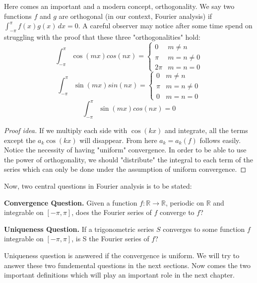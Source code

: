 \documentclass{article}
\theoremstyle{remark}
\theoremstyle{lemma}
\theoremstyle{example}
\theoremstyle{proofTrial}
\theoremstyle{definition}
\begin{document}
    Here comes an important and a modern concept, orthogonality\footnotemark{}. We say two functions $f$ and $g$ are orthogonal (in our context, Fourier analysis) if $\int_{-\pi}^{\pi} f(x)g(x)\,dx = 0$. A careful observer may notice after some time spend on struggling with the proof that these three "orthogonalities" hold:
    \[
    \int_{-\pi}^{\pi} \cos(mx)cos(nx) = \begin{cases}
                                        0 & m \neq n \\
                                      \pi &  m = n \neq 0\\
                                     2\pi & m = n = 0
                                        \end{cases}
    \]
    \[
    \int_{-\pi}^{\pi} \sin(mx)sin(nx) = \begin{cases}
                                        0 & m \neq n \\
                                      \pi &  m = n \neq 0\\
                                        0 & m = n = 0
                                        \end{cases}
    \]
    \[
    \int_{-\pi}^{\pi} \sin(mx)cos(nx) = 0
    \]

\begin{proof}[Proof idea]
    If we multiply each side with $\cos(kx)$ and integrate, all the terms except the $a_k \cos(kx)$ will disappear. From here $a_k = a_k(f)$ follows easily. \hfill
    \indent Notice the necessity of having "uniform" convergence. In order to be able to use the power of orthogonality, we should "distribute" the integral to each term of the series which can only be done under the assumption of uniform convergence.
\end{proof}
    Now, two central questions in Fourier analysis is to be stated:

\textbf{Convergence Question.} Given a function \( f : \mathbb{R} \to \mathbb{R} \), periodic on \( \mathbb{R} \) and integrable on \( [-\pi, \pi] \), does the Fourier series of \( f \) converge to \( f \)?

\textbf{Uniqueness Question.} If a trigonometric series \( S \) converges to some function \( f \) integrable on \( [-\pi, \pi] \), is S the Fourier series of \(f\)?

Uniqueness question is answered if the convergence is uniform. We will try to answer these two fundemental questions in the next sections. Now comes the two important definitions which will play an important role in the next chapter.\footnotemark{}
\end{document}
